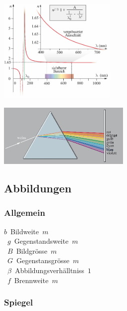 \begin{center}
	\begin{minipage}{0.25\textwidth}
		\includegraphics[height=5cm,keepaspectratio=true]{Images/dispersion_graph.png}
	\end{minipage}%
	\begin{minipage}{0.3\textwidth}
		\includegraphics[height=3cm,keepaspectratio=true]{Images/dispersion_prisma.png}
	\end{minipage}
\end{center}


\subsection{Abbildungen}
\subsubsection{Allgemein}


\unit{$ b $}{Bildweite}{$ m $} \\
\unit{$ g $}{Gegenstandsweite}{$ m $} \\
\unit{$ B $}{Bildgrösse}{$ m $} \\
\unit{$ G $}{Gegenstansgrösse}{$ m $} \\
\unit{$ \beta $}{Abbildungsverhälltniss}{$ 1 $} \\
\unit{$ f $}{Brennweite}{$ m $} \\

\subsubsection{Spiegel}

